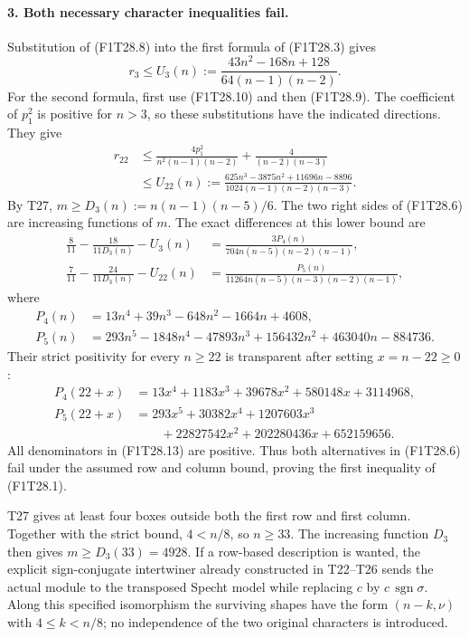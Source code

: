 \paragraph{3. Both necessary character inequalities fail.}
Substitution of (F1T28.8) into the first formula of
(F1T28.3) gives
\[
 r_3\le U_3(n):=
       \frac{43n^2-168n+128}{64(n-1)(n-2)}.
 \tag{F1T28.11}
\]
For the second formula, first use (F1T28.10) and then
(F1T28.9). The coefficient of $p_1^2$ is positive
for $n>3$, so these substitutions have the indicated
directions. They give
\[
\begin{split}
 r_{22}
 &\le\frac{4p_1^2}{n^2(n-1)(n-2)}
                 +\frac4{(n-2)(n-3)}\\
 &\le U_{22}(n):=
 \frac{625n^3-3875n^2+11696n-8896}
      {1024(n-1)(n-2)(n-3)} .
\end{split}
 \tag{F1T28.12}
\]
By T27, $m\ge D_3(n):=n(n-1)(n-5)/6$.
The two right sides of (F1T28.6) are increasing functions
of $m$. The exact differences at this lower bound are
\[
\begin{split}
 \frac8{11}-\frac{18}{11D_3(n)}-U_3(n)
 &=\frac{3P_4(n)}
         {704n(n-5)(n-2)(n-1)},\\
 \frac7{11}-\frac{24}{11D_3(n)}-U_{22}(n)
 &=\frac{P_5(n)}
         {11264n(n-5)(n-3)(n-2)(n-1)},
\end{split}
 \tag{F1T28.13}
\]
where
\[
\begin{split}
P_4(n)&=13n^4+39n^3-648n^2-1664n+4608,\\
P_5(n)&=293n^5-1848n^4-47893n^3
                     +156432n^2+463040n-884736.
\end{split}
\]
Their strict positivity for every $n\ge22$ is transparent
after setting $x=n-22\ge0$:
\[
\begin{split}
P_4(22+x)
 &=13x^4+1183x^3+39678x^2+580148x+3114968,\\
P_5(22+x)
 &=293x^5+30382x^4+1207603x^3\\
 &\qquad+22827542x^2+202280436x+652159656.
\end{split}
 \tag{F1T28.14}
\]
All denominators in (F1T28.13) are positive.
Thus both alternatives in (F1T28.6) fail under the
assumed row and column bound, proving the first
inequality of (F1T28.1).

T27 gives at least four boxes outside both the first
row and first column. Together with the strict bound,
$4<n/8$, so $n\ge33$. The increasing function $D_3$
then gives $m\ge D_3(33)=4928$.
If a row-based description is wanted, the explicit
sign-conjugate intertwiner already constructed in
T22--T26 sends the actual module to the transposed
Specht model while replacing $c$ by
$c\,\operatorname{sgn}\sigma$. Along this specified
isomorphism the surviving shapes have the form
$(n-k,\nu)$ with $4\le k<n/8$; no independence of
the two original characters is introduced.

